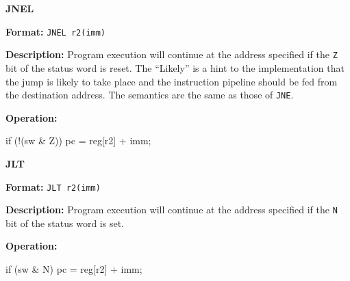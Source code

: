 \noindent\textsf{\textbf{\Large JNEL}}\par
{}\par\begin{indented}{\bf Format:}
{\tt JNEL r2(imm)}\par\vspace{3ex}
\end{indented}\vspace{4ex}
\begin{indented}{\bf Description:}
Program execution will continue at the address specified if the {\tt Z} bit
of the status word is reset.  The ``Likely'' is a hint to the implementation
that the jump is likely to take place and the instruction pipeline should
be fed from the destination address.  The semantics are the same as those
of {\tt JNE}.
\end{indented}
\begin{indented}{\bf Operation:}\vspace{.8ex}
\begin{verbatimtab}
if (!(sw & Z)) {
    pc = reg[r2] + imm;
}
\end{verbatimtab}
\end{indented}
\vspace{2em}

\newpage
\noindent\textsf{\textbf{\Large JLT}}\par
{}\par\begin{indented}{\bf Format:}
{\tt JLT r2(imm)}\par\vspace{3ex}
\end{indented}\vspace{4ex}
\begin{indented}{\bf Description:}
Program execution will continue at the address specified if the {\tt N} bit
of the status word is set.
\end{indented}
\begin{indented}{\bf Operation:}\vspace{.8ex}
\begin{verbatimtab}
if (sw & N) {
    pc = reg[r2] + imm;
}
\end{verbatimtab}
\end{indented}
\vspace{2em}


